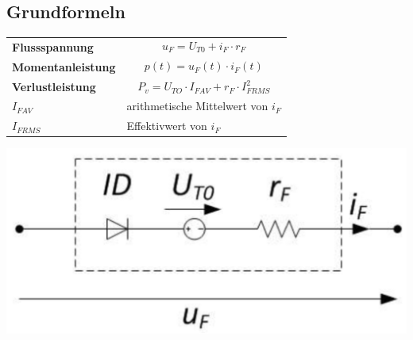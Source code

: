\begin{multicols}{2}
\subsection{Grundformeln}
\begin{tabular}{ll}
    \textbf{Flussspannung}&\[ u_F = U_{T0} + i_F \cdot r_F \]\\
    \textbf{Momentanleistung}&\[ p(t)=u_F(t)\cdot i_F(t) \]\\
    \textbf{Verlustleistung}&\[ P_v=U_{TO}\cdot I_{FAV}+r_F\cdot I_{FRMS}^2 \]\\
    $ I_{FAV}$ & \qquad arithmetische Mittelwert von $ i_F $\\
    $ I_{FRMS} $ & \qquad Effektivwert von $ i_F $\\    
\end{tabular}

\hspace{1cm}\includegraphics[width=0.6\linewidth]{images/ESBDiode} 
\end{multicols}

